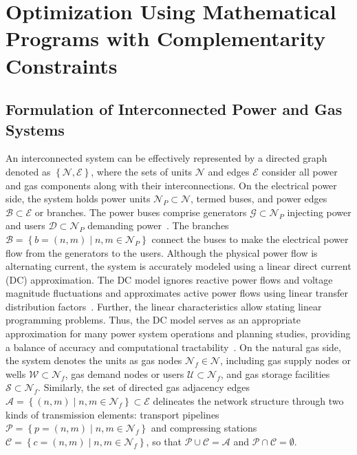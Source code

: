 \chapter{Optimization Using Mathematical Programs with Complementarity Constraints} \label{cap:mpcc}

\section{Formulation of Interconnected Power and Gas Systems} \label{sec:formulation}


An interconnected system can be effectively represented by a directed graph denoted as $\left\lbrace\mathcal{N}, \mathcal{E}\right\rbrace$, where the sets of units $\mathcal{N}$ and edges $\mathcal{E}$ consider all power and gas components along with their interconnections. On the electrical power side, the system holds power units $\mathcal{N}_P\subset\mathcal{N}$, termed buses, and power edges $\mathcal{B}\subset\mathcal{E}$ or branches. The power buses comprise generators $\mathcal{G}\subset\mathcal{N}_P$ injecting power and users $\mathcal{D}\subset\mathcal{N}_P$ demanding power~\cite{WANG2019113410}. The branches $\mathcal{B} = \left\{b=(n,m) \mid n,m\in\mathcal{N}_P \right\}$ connect the buses to make the electrical power flow from the generators to the users. Although the physical power flow is alternating current, the system is accurately modeled using a linear direct current (DC) approximation. The DC model ignores reactive power flows and voltage magnitude fluctuations and approximates active power flows using linear transfer distribution factors~\cite{DC_flow}. Further, the linear characteristics allow stating linear programming problems. Thus, the DC model serves as an appropriate approximation for many power system operations and planning studies, providing a balance of accuracy and computational tractability~\cite{DC_flow2}. On the natural gas side, the system denotes the units as gas nodes $\mathcal{N}_{f}\in\mathcal{N}$, including gas supply nodes or wells $\mathcal{W} \subset \mathcal{N}_{f}$, gas demand nodes or users $\mathcal{U} \subset \mathcal{N}_{f}$, and gas storage facilities $\mathcal{S} \subset \mathcal{N}_{f}$. Similarly, the set of directed gas adjacency edges $\mathcal{A} = \left\{(n,m) \mid n,m\in\mathcal{N}_f \right\} \subset \mathcal{E}$ delineates the network structure through two kinds of transmission elements: transport pipelines $\mathcal{P} = \left\{p=(n,m) \mid n,m\in\mathcal{N}_f \right\}$ and compressing stations $\mathcal{C} = \left\{c=(n,m) \mid n,m\in\mathcal{N}_f \right\}$, so that $\mathcal{P}\cup\mathcal{C}=\mathcal{A}$ and $\mathcal{P}\cap\mathcal{C}=\emptyset$.


